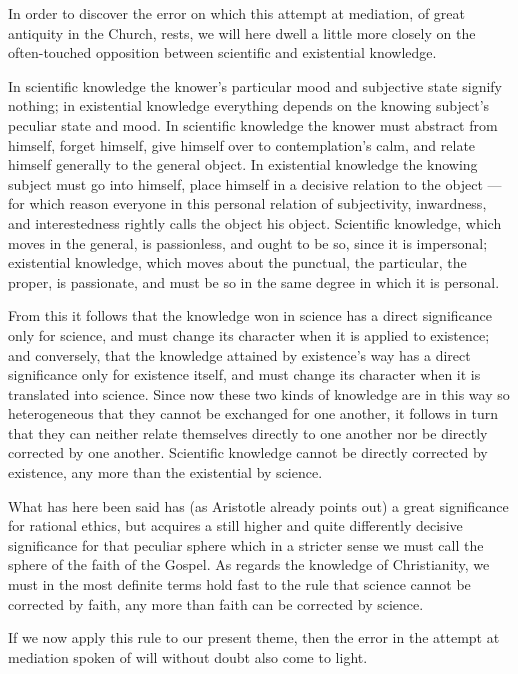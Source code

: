 \documentclass[12pt,a4paper]{book}
\begin{document}
In order to discover the error on which this attempt at mediation, of great antiquity in
the Church, rests, we will here dwell a little more closely on the often-touched opposition
between scientific and existential knowledge.

In scientific knowledge the knower's particular mood and subjective state signify nothing;
in existential knowledge everything depends on the knowing subject's peculiar state and
mood. In scientific knowledge the knower must abstract from himself, forget himself, give
himself over to contemplation's calm, and relate himself generally to the general object. In
existential knowledge the knowing subject must go into himself, place himself in a decisive
relation to the object --- for which reason everyone in this personal relation of
subjectivity, inwardness, and interestedness rightly calls the object his object. Scientific
knowledge, which moves in the general, is passionless, and ought to be so, since it is
impersonal; existential knowledge, which moves about the punctual, the particular, the
proper, is passionate, and must be so in the same degree in which it is personal.

From this it follows that the knowledge won in science has a direct significance only for
science, and must change its character when it is applied to existence; and conversely, that
the knowledge attained by existence's way has a direct significance only for existence
itself, and must change its character when it is translated into science. Since now these
two kinds of knowledge are in this way so heterogeneous that they cannot be exchanged for
one another, it follows in turn
that they can neither relate themselves directly to one another nor be directly corrected by
one another. Scientific knowledge cannot be directly corrected by existence, any more than
the existential by science.

What has here been said has (as Aristotle already points out) a great significance for
rational ethics, but acquires a still higher and quite differently decisive significance for
that peculiar sphere which in a stricter sense we must call the sphere of the faith of the
Gospel. As regards the knowledge of Christianity, we must in the most definite terms hold
fast to the rule that science cannot be corrected by faith, any more than faith can be
corrected by science.

If we now apply this rule to our present theme, then the error in the attempt at mediation
spoken of will without doubt also come to light.
\end{document}
